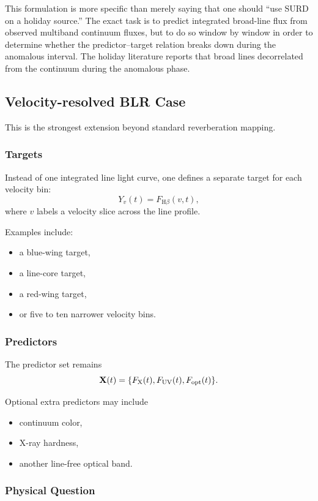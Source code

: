 \documentclass{article}
\begin{document}
This formulation is more specific than merely saying that one should ``use SURD on a holiday source.'' The exact task is to predict integrated broad-line flux from observed multiband continuum fluxes, but to do so window by window in order to determine whether the predictor--target relation breaks down during the anomalous interval. The holiday literature reports that broad lines decorrelated from the continuum during the anomalous phase.

\subsection{Velocity-resolved BLR Case}

This is the strongest extension beyond standard reverberation mapping.

\subsubsection{Targets}

Instead of one integrated line light curve, one defines a separate target for each velocity bin:
\[
Y_v(t)=F_{\mathrm{H}\beta}(v,t),
\]
where \(v\) labels a velocity slice across the line profile.

Examples include:
\begin{itemize}
    \item a blue-wing target,
    \item a line-core target,
    \item a red-wing target,
    \item or five to ten narrower velocity bins.
\end{itemize}

\subsubsection{Predictors}

The predictor set remains
\[
\mathbf{X}(t)=\{F_{\rm X}(t),F_{\rm UV}(t),F_{\rm opt}(t)\}.
\]

Optional extra predictors may include
\begin{itemize}
    \item continuum color,
    \item X-ray hardness,
    \item another line-free optical band.
\end{itemize}

\subsubsection{Physical Question}
\end{document}
